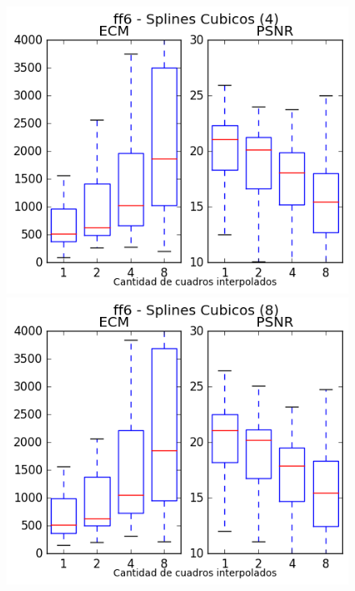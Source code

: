 \begin{figure}[H]
\centering
\begin{minipage}{0.33\textwidth}   
    \includegraphics[width=1\textwidth]{imgs/resultados_error/ff6_2.png} 
\end{minipage}\hfill
\begin{minipage}{0.33\textwidth}   
    \includegraphics[width=1\textwidth]{imgs/resultados_error/ff6_3.png} 
\end{minipage}\hfill
\begin{minipage}{0.33\textwidth}   

\end{minipage}
\end{figure}

